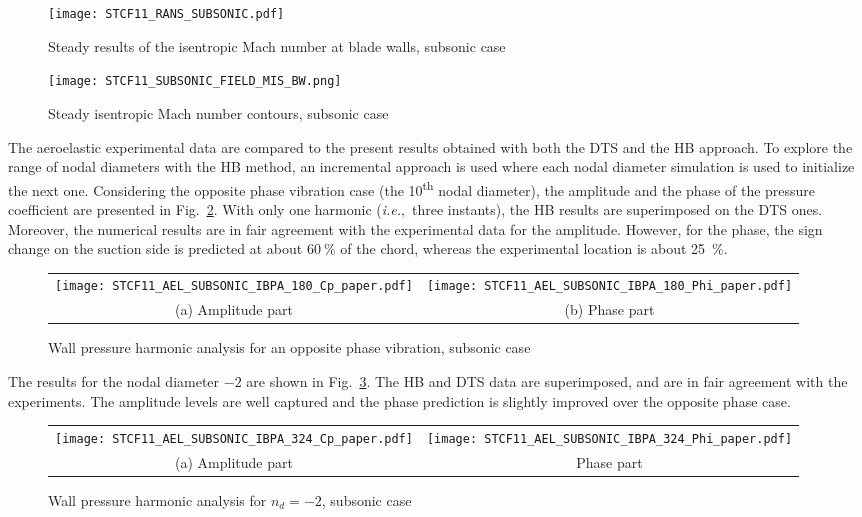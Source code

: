 \begin{figure}[htb]
  \centering
  \begin{minipage}[b]{.46\linewidth}
    \centering
    \texttt{[image: STCF11\_RANS\_SUBSONIC.pdf]}
    \caption{Steady results of the isentropic Mach number at blade
      walls, subsonic case}
    \label{fig:stcf11_rans_subsonic}
  \end{minipage}\quad
  \begin{minipage}[b]{.46\linewidth}
    \centering
    \texttt{[image: STCF11\_SUBSONIC\_FIELD\_MIS\_BW.png]}
    \caption{Steady isentropic Mach number contours, subsonic case}
    \label{fig:stcf11_subsonic_field_mis_bw}
  \end{minipage}
\end{figure}

The aeroelastic experimental data are compared to the present results
obtained with both the DTS and the HB approach. To explore the range
of nodal diameters with the HB method, an incremental approach is used
where each nodal diameter simulation is used to initialize the next
one.  Considering the opposite phase vibration case (the 10\textsuperscript{th} nodal diameter), 
the amplitude and the phase of the pressure coefficient are
presented in Fig.~\ref{fig:stcf11_ael_subsonic_ibpa_180_paper}.
With only one harmonic (\emph{i.e.},~three instants), the HB results
are superimposed on the DTS ones. Moreover, the numerical results are
in fair agreement with the experimental data for the
amplitude. However, for the phase, the sign change on the
suction side is predicted at about $60~\%$ of the chord, whereas the
experimental location is about 25~\%.
\begin{figure}[htb]
  \centering 
  \begin{tabular}{cc}
    \texttt{[image: STCF11\_AEL\_SUBSONIC\_IBPA\_180\_Cp\_paper.pdf]}
    &
    \texttt{[image: STCF11\_AEL\_SUBSONIC\_IBPA\_180\_Phi\_paper.pdf]}\\
    (a) Amplitude part & (b) Phase part
  \end{tabular}
  \caption{Wall pressure harmonic analysis for an opposite phase vibration, subsonic case}
  \label{fig:stcf11_ael_subsonic_ibpa_180_paper}
\end{figure}


The results for the  nodal  diameter $-2$ are shown
in Fig.~\ref{fig:stcf11_ael_subsonic_ibpa_324_paper}. The HB and DTS data
are superimposed, and are in fair agreement with the experiments. The
amplitude levels are well captured and the phase prediction is
slightly improved over the opposite phase case.
\begin{figure}[htb]
  \centering 
  \begin{tabular}{cc}
    \texttt{[image: STCF11\_AEL\_SUBSONIC\_IBPA\_324\_Cp\_paper.pdf]}
    &
    \texttt{[image: STCF11\_AEL\_SUBSONIC\_IBPA\_324\_Phi\_paper.pdf]}\\
    (a) Amplitude part & Phase part
  \end{tabular}
  \caption{Wall pressure harmonic analysis for \mbox{$n_d=-2$}, subsonic case}
  \label{fig:stcf11_ael_subsonic_ibpa_324_paper}
\end{figure}

